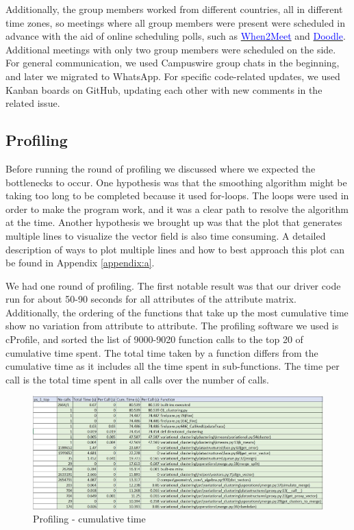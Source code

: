 \documentclass[11pt]{article}
\begin{document}
Additionally, the group members worked from different countries, all in different time zones, so meetings where all group members were present were scheduled in advance with the aid of online scheduling polls, such as \href{https://www.when2meet.com/}{\textcolor{blue}{When2Meet}} and \href{https://doodle.com/en/}{\textcolor{blue}{Doodle}}. Additional meetings with only two group members were scheduled on the side. For general communication, we used Campuswire group chats in the beginning, and later we migrated to WhatsApp. For specific code-related updates, we used Kanban boards on GitHub, updating each other with new comments in the related issue.

\subsection{Profiling}
Before running the round of profiling we discussed where we expected the bottlenecks to occur. One hypothesis was that the smoothing algorithm might be taking too long to be completed because it used for-loops. The loops were used in order to make the program work, and it was a clear path to resolve the algorithm at the time. Another hypothesis we brought up was that the plot that generates multiple lines to visualize the vector field is also time consuming. A detailed description of ways to plot multiple lines and how to best approach this plot can be found in Appendix \ref{appendix:a}.

We had one round of profiling. The first notable result was that our driver code run for about 50-90 seconds for all attributes of the attribute matrix. Additionally, the ordering of the functions that take up the most cumulative time show no variation from attribute to attribute. The profiling software we used is cProfile, and sorted the list of 9000-9020 function calls to the top 20 of cumulative time spent. The total time taken by a function differs from the cumulative time as it includes all the time spent in sub-functions. The time per call is the total time spent in all calls over the number of calls.

\begin{figure}[H]
    \centering
    \includegraphics[scale=0.63]{images/Profiling.JPG}
	\caption{Profiling - cumulative time}
	\label{fig:cumtime}
\end{figure}
\end{document}
